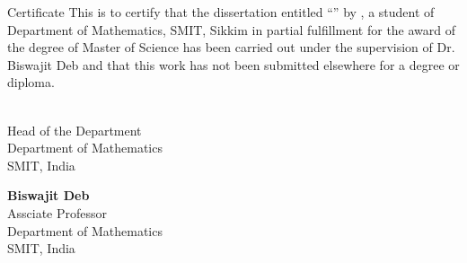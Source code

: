 \begin{preface}{\sf Certificate}
\baselineskip=18pt
\vspace*{0.8in}
This is to certify that the  dissertation entitled
``{\bf \thesistitle}'' by  \authorname,  a student of Department of
Mathematics, SMIT, Sikkim in partial fulfillment for the award of the degree
of Master of Science has been carried out under the supervision of Dr. Biswajit Deb and that this
work has not been submitted elsewhere for a degree or diploma.


\vspace*{1.5in}
\noindent

\begin{minipage}[t]{0.50\textwidth}
\baselineskip=18pt
    \\
    Head of the Department\\
    Department of Mathematics\\
    SMIT, India
    \end{minipage}
    \hspace{.4in}
    \begin{minipage}[t]{0.65\textwidth}
\baselineskip=18pt
  {\bf Biswajit Deb}\\
    Assciate Professor\\
    Department of Mathematics\\
    SMIT, India
\end{minipage}
\end{preface} %
